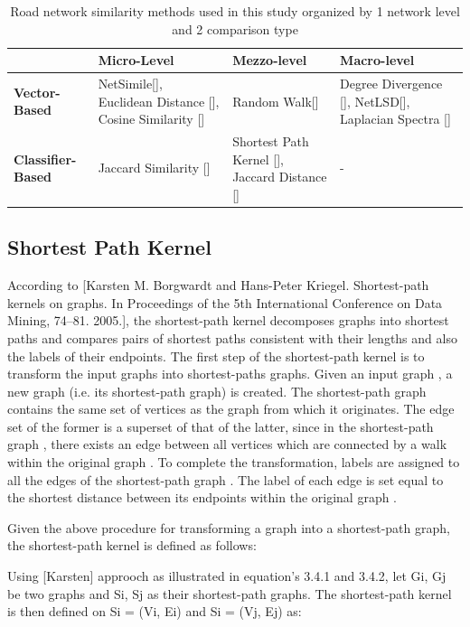 \begin{table}[!h]
\centering
\begin{tabular}{ |p{3cm}|p{3cm}|p{3cm}| p{3cm} | }
\hline
& \textbf{Micro-Level} & \textbf{Mezzo-level} & \textbf{Macro-level} \\ \hline
\textbf{Vector-Based} & NetSimile[], Euclidean Distance [], Cosine Similarity [] & Random Walk[] & Degree Divergence [], NetLSD[], Laplacian Spectra [] \\ \hline
\textbf{Classifier-Based} & Jaccard Similarity [] & Shortest Path Kernel [], Jaccard Distance [] & - \\ \hline
\end{tabular}
\caption{Road network similarity methods used in this study organized by 1 network level and 2 comparison type}
\label{tab:Road Network Similarity Methods}
\end{table}

\subsection{Shortest Path Kernel}

According to [Karsten M. Borgwardt and Hans-Peter Kriegel. Shortest-path kernels on graphs. In Proceedings of the 5th International Conference on Data Mining, 74–81. 2005.], the shortest-path kernel decomposes graphs into shortest paths and compares pairs of shortest paths consistent with their lengths and also the labels of their endpoints. The first step of the shortest-path kernel is to transform the input graphs into shortest-paths graphs. Given an input graph , a new graph  (i.e. its shortest-path graph) is created. The shortest-path graph  contains the same set of vertices as the graph from which it originates. The edge set of the former is a superset of that of the latter, since in the shortest-path graph , there exists an edge between all vertices which are connected by a walk within the original graph . To complete the transformation, labels are assigned to all the edges of the shortest-path graph . The label of each edge is set equal to the shortest distance between its endpoints within the original graph .

Given the above procedure for transforming a graph into a shortest-path graph, the shortest-path kernel is defined as follows:

Using [Karsten] approoch as illustrated in equation's 3.4.1 and 3.4.2, let Gi, Gj be two graphs and Si, Sj as their shortest-path graphs. The shortest-path kernel is then defined on Si  = (Vi, Ei) and Si = (Vj, Ej) as:

